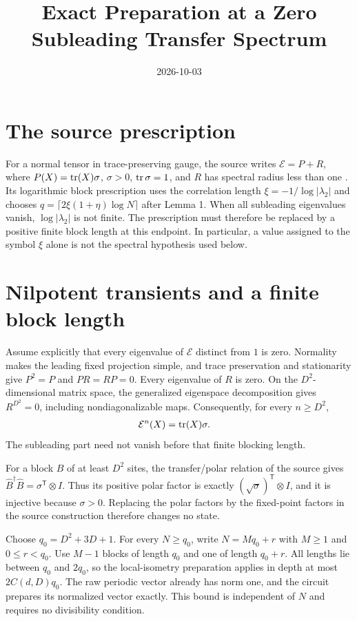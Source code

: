 \documentclass{article}
\title{Exact Preparation at a Zero Subleading Transfer Spectrum}
\author{}
\date{2026-10-03}
\begin{document}
\maketitle
{}

\section{The source prescription}

For a normal tensor in trace-preserving gauge, the source writes
$\mathcal E=P+R$, where $P(X)=\operatorname{tr}(X)\sigma$, $\sigma>0$,
$\operatorname{tr}\sigma=1$, and $R$ has spectral radius less than one
\cite[paragraph ``Preliminaries'']{Malz2024Preparation}.
Its logarithmic block prescription uses the correlation length
$\xi=-1/\log|\lambda_2|$ and chooses
$q=\lceil2\xi(1+\eta)\log N\rceil$ after Lemma 1.
When all subleading eigenvalues vanish, $\log|\lambda_2|$ is not finite.
The prescription must therefore be replaced by a positive finite block
length at this endpoint. In particular, a value assigned to the symbol
$\xi$ alone is not the spectral hypothesis used below.

\section{Nilpotent transients and a finite block length}

Assume explicitly that every eigenvalue of $\mathcal E$ distinct from
$1$ is zero. Normality makes the leading fixed projection simple, and
trace preservation and stationarity give $P^2=P$ and $PR=RP=0$.
Every eigenvalue of $R$ is zero. On the $D^2$-dimensional matrix space,
the generalized eigenspace decomposition gives $R^{D^2}=0$, including
nondiagonalizable maps. Consequently, for every $n\geq D^2$,
\begin{align}
    \mathcal E^n(X)&=\operatorname{tr}(X)\sigma.
    \label{eq:mswc24_zero_spectrum_transfer}
\end{align}
The subleading part need not vanish before that finite blocking length.

For a block $B$ of at least $D^2$ sites, the transfer/polar relation of
the source gives $\widehat B^\dagger\widehat B=\sigma^{\mathsf T}\otimes I$.
Thus its positive polar factor is exactly
$(\sqrt\sigma)^{\mathsf T}\otimes I$, and it is injective because
$\sigma>0$. Replacing the polar factors by the fixed-point factors in
the source construction therefore changes no state.

Choose $q_0=D^2+3D+1$. For every $N\geq q_0$, write
$N=Mq_0+r$ with $M\geq1$ and $0\leq r<q_0$.
Use $M-1$ blocks of length $q_0$ and one of length $q_0+r$.
All lengths lie between $q_0$ and $2q_0$, so the local-isometry
preparation applies in depth at most $2C(d,D)q_0$.
The raw periodic vector already has norm one, and the circuit prepares
its normalized vector exactly. This bound is independent of $N$ and
requires no divisibility condition.
\end{document}
